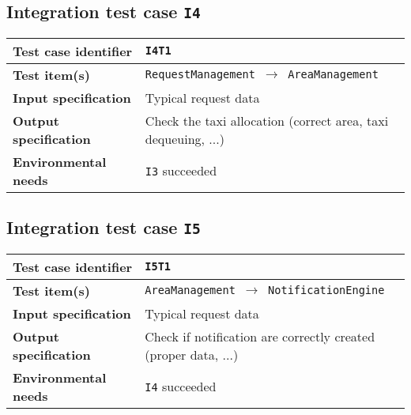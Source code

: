 \subsection{Integration test case \normalfont\texttt{I4}}\label{subsec:t4}

\begin{table*}[!h]\centering\begin{tabularx}{.9\textwidth}{ >{\bfseries}l X }\toprule%
Test case identifier	&	\texttt{I4T1}	\\\midrule
Test item(s)		&	\texttt{RequestManagement $\to$ AreaManagement}	\\\midrule
Input specification	&	Typical request data	\\\midrule
Output specification	&	Check the taxi allocation (correct area, taxi dequeuing, ...)	\\\midrule
Environmental needs	&	\texttt{I3} succeeded	\\
\bottomrule\end{tabularx}\end{table*}









\subsection{Integration test case \normalfont\texttt{I5}}\label{subsec:t5}




\begin{table*}[!h]\centering\begin{tabularx}{.9\textwidth}{ >{\bfseries}l X }\toprule%
Test case identifier	&	\texttt{I5T1}	\\\midrule
Test item(s)		&	\texttt{AreaManagement $\to$ NotificationEngine}	\\\midrule
Input specification	&	Typical request data	\\\midrule
Output specification	&	Check if notification are correctly created (proper data, ...)	\\\midrule
Environmental needs	&	\texttt{I4} succeeded	\\
\bottomrule\end{tabularx}\end{table*}










